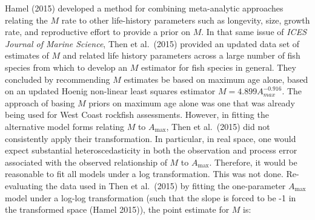 \documentclass[11pt,
  english,
  a4paper,
]{article}
\begin{document}
Hamel {(2015)\leavevmode\tagmcend\tagstructend} developed a method for combining meta-analytic approaches relating the {\(M\)\leavevmode\tagmcend\tagstructend} rate to other life-history parameters such as longevity, size, growth rate, and reproductive effort to provide a prior on {\(M\)\leavevmode\tagmcend\tagstructend}. In that same issue of \emph{ICES Journal of Marine Science}, Then et al.~{(2015)\leavevmode\tagmcend\tagstructend} provided an updated data set of estimates of {\(M\)\leavevmode\tagmcend\tagstructend} and related life history parameters across a large number of fish species from which to develop an {\(M\)\leavevmode\tagmcend\tagstructend} estimator for fish species in general. They concluded by recommending {\(M\)\leavevmode\tagmcend\tagstructend} estimates be based on maximum age alone, based on an updated Hoenig non-linear least squares estimator {\(M = 4.899A^{-0.916}_{max}\)\leavevmode\tagmcend\tagstructend}. The approach of basing {\(M\)\leavevmode\tagmcend\tagstructend} priors on maximum age alone was one that was already being used for West Coast rockfish assessments. However, in fitting the alternative model forms relating {\(M\)\leavevmode\tagmcend\tagstructend} to {\(A_{\text{max}}\)\leavevmode\tagmcend\tagstructend}, Then et al.~{(2015)\leavevmode\tagmcend\tagstructend} did not consistently apply their transformation. In particular, in real space, one would expect substantial heteroscedasticity in both the observation and process error associated with the observed relationship of {\(M\)\leavevmode\tagmcend\tagstructend} to {\(A_{\text{max}}\)\leavevmode\tagmcend\tagstructend}. Therefore, it would be reasonable to fit all models under a log transformation. This was not done. Re-evaluating the data used in Then et al.~{(2015)\leavevmode\tagmcend\tagstructend} by fitting the one-parameter {\(A_{\text{max}}\)\leavevmode\tagmcend\tagstructend} model under a log-log transformation (such that the slope is forced to be -1 in the transformed space {(Hamel 2015)\leavevmode\tagmcend\tagstructend}), the point estimate for {\(M\)\leavevmode\tagmcend\tagstructend} is:
\end{document}
